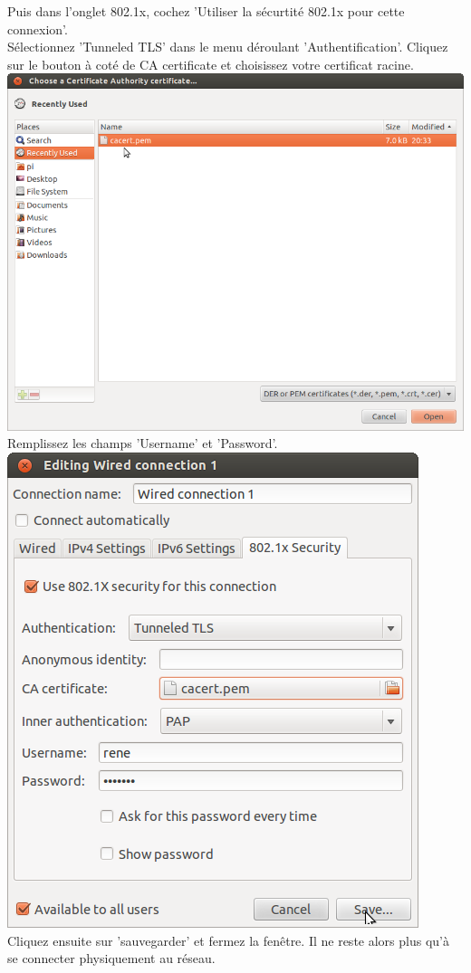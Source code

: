 Puis dans l'onglet 802.1x, cochez 'Utiliser la sécurtité 802.1x pour cette connexion'.\\
Sélectionnez 'Tunneled TLS' dans le menu déroulant 'Authentification'. 
Cliquez sur le bouton à coté de CA certificate et choisissez votre certificat racine.\\
\includegraphics[width=\screenShotSize{}]{img/selectCacert.png}\\
Remplissez les champs 'Username' et 'Password'.\\
\includegraphics[width=\screenShotSize{}]{img/ttls.png}\\
Cliquez ensuite sur 'sauvegarder' et fermez la fenêtre.
Il ne reste alors plus qu'à se connecter physiquement au réseau.\\


